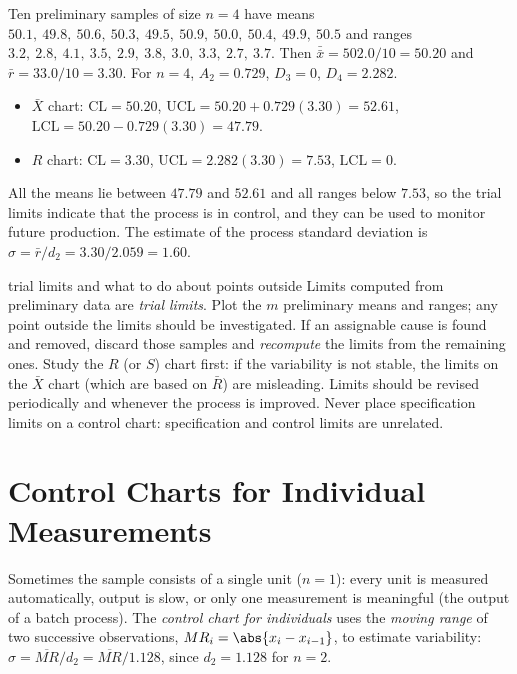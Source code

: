 \begin{example}\label{ex:xbarR}
Ten preliminary samples of size $n=4$ have means $50.1,\ 49.8,\ 50.6,\ 50.3,\ 49.5,\ 50.9,\ 50.0,\ 50.4,\ 49.9,\ 50.5$ and ranges $3.2,\ 2.8,\ 4.1,\ 3.5,\ 2.9,\ 3.8,\ 3.0,\ 3.3,\ 2.7,\ 3.7$. Then $\bar{\bar{x}}=502.0/10=50.20$ and $\bar{r}=33.0/10=3.30$. For $n=4$, $A_2=0.729$, $D_3=0$, $D_4=2.282$.
\begin{itemize}
  \item $\bar{X}$ chart: $\mathrm{CL}=50.20$, $\mathrm{UCL}=50.20+0.729(3.30)=52.61$, $\mathrm{LCL}=50.20-0.729(3.30)=47.79$.
  \item $R$ chart: $\mathrm{CL}=3.30$, $\mathrm{UCL}=2.282(3.30)=7.53$, $\mathrm{LCL}=0$.
\end{itemize}
All the means lie between $47.79$ and $52.61$ and all ranges below $7.53$, so the trial limits indicate that the process is in control, and they can be used to monitor future production. The estimate of the process standard deviation is $\hat\sigma=\bar{r}/d_2=3.30/2.059=1.60$.
\end{example}

\begin{pitfall}{trial limits and what to do about points outside}
Limits computed from preliminary data are \emph{trial limits}. Plot the $m$ preliminary means and ranges; any point outside the limits should be investigated. If an assignable cause is found and removed, discard those samples and \emph{recompute} the limits from the remaining ones. Study the $R$ (or $S$) chart first: if the variability is not stable, the limits on the $\bar{X}$ chart (which are based on $\bar{R}$) are misleading. Limits should be revised periodically and whenever the process is improved. Never place specification limits on a control chart: specification and control limits are unrelated.
\end{pitfall}

\section{Control Charts for Individual Measurements}

Sometimes the sample consists of a single unit ($n=1$): every unit is measured automatically, output is slow, or only one measurement is meaningful (the output of a batch process). The \emph{control chart for individuals} uses the \emph{moving range} of two successive observations, $MR_i=\abs{x_i-x_{i-1}}$, to estimate variability: $\hat\sigma=\overline{MR}/d_2=\overline{MR}/1.128$, since $d_2=1.128$ for $n=2$.

